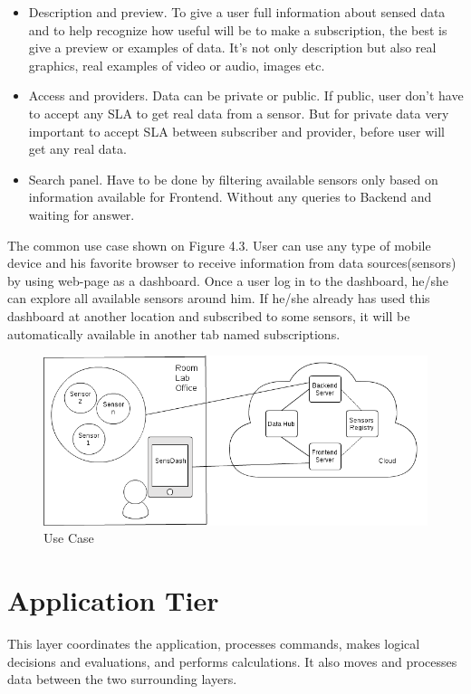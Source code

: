 \begin{itemize}
      \item Description and preview. To give a user full information about sensed data and to help recognize how useful will be to make a subscription, the best is give a preview or examples of data. It's not only description but also real graphics, real examples of video or audio, images etc.
      \item Access and providers. Data can be private or public. If public, user don't have to accept any SLA to get real data from a sensor. But for private data very important to accept SLA between subscriber and provider, before user will get any real data.
      \item Search panel. Have to be done by filtering available sensors only based on information available for Frontend. Without any queries to Backend and waiting for answer.
      \end{itemize}

    The common use case shown on Figure 4.3. User can use any type of mobile device and his favorite browser to receive information from data sources(sensors) by using web-page as a dashboard. Once a user log in to the dashboard, he/she can explore all available sensors around him. If he/she already has used this dashboard at another location and subscribed to some sensors, it will be automatically available in another tab named subscriptions. 

        \begin{figure}[!ht]
        \centering
        \includegraphics[scale=0.6]{images/User_Case.png}   
        \caption[Use Case]{Use Case}
        \label{img:structure}                           
        \end{figure}

\section{Application Tier}
  This layer coordinates the application, processes commands, makes logical decisions and evaluations, and performs calculations. It also moves and processes data between the two surrounding layers.


